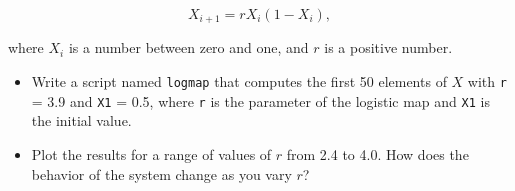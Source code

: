
\begin{equation*}
X_{i+1} = r X_i (1-X_i),
\end{equation*}

where $X_i$ is a number between zero and one, and $r$ is a positive number.

\begin{itemize}

\item Write a script named \lstinline{logmap} that computes the first 50
elements of $X$ with \lstinline{r} = 3.9 and \lstinline{X1} = 0.5, where
\lstinline{r} is the parameter of the logistic map and \lstinline{X1} is the
initial value.

\item Plot the results for a range of values of $r$ from 2.4 to 4.0.
How does the behavior of the system change as you vary $r$?

\end{itemize}




